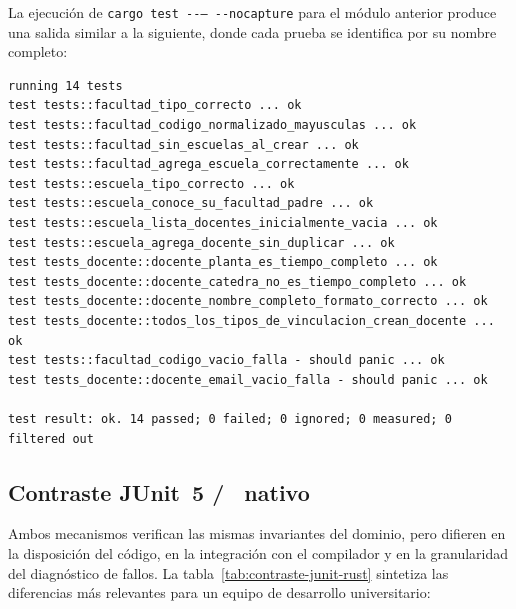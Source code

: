 La ejecución de \texttt{cargo test -{}-{}-- -{}-nocapture} para el módulo anterior produce
una salida similar a la siguiente, donde cada prueba se identifica por su nombre completo:

\begin{lstlisting}[style=rustStyle,
  caption={Salida representativa de \texttt{cargo test} para el módulo de dominio.},
  label={lst:cargo-test-output}]
running 14 tests
test tests::facultad_tipo_correcto ... ok
test tests::facultad_codigo_normalizado_mayusculas ... ok
test tests::facultad_sin_escuelas_al_crear ... ok
test tests::facultad_agrega_escuela_correctamente ... ok
test tests::escuela_tipo_correcto ... ok
test tests::escuela_conoce_su_facultad_padre ... ok
test tests::escuela_lista_docentes_inicialmente_vacia ... ok
test tests::escuela_agrega_docente_sin_duplicar ... ok
test tests_docente::docente_planta_es_tiempo_completo ... ok
test tests_docente::docente_catedra_no_es_tiempo_completo ... ok
test tests_docente::docente_nombre_completo_formato_correcto ... ok
test tests_docente::todos_los_tipos_de_vinculacion_crean_docente ... ok
test tests::facultad_codigo_vacio_falla - should panic ... ok
test tests_docente::docente_email_vacio_falla - should panic ... ok

test result: ok. 14 passed; 0 failed; 0 ignored; 0 measured; 0 filtered out
\end{lstlisting}

\subsection{Contraste JUnit~5 / \rust\ nativo}
\label{subsec:contraste-junit-rust}

Ambos mecanismos verifican las mismas invariantes del dominio, pero difieren en la
disposición del código, en la integración con el compilador y en la granularidad del
diagnóstico de fallos. La tabla~\ref{tab:contraste-junit-rust} sintetiza las diferencias
más relevantes para un equipo de desarrollo universitario:

